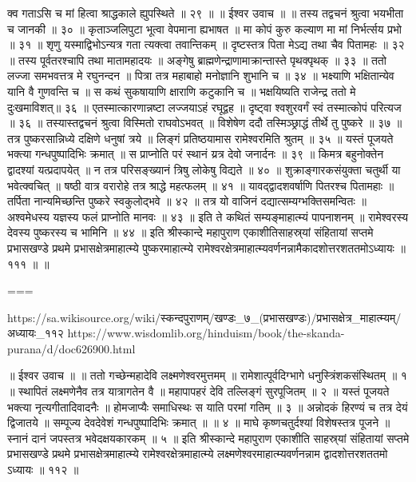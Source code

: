 क्व गताऽसि च मां हित्वा श्राद्धकाले ह्युपस्थिते ॥ २९ ॥
॥ ईश्वर उवाच ॥ ॥
तस्य तद्वचनं श्रुत्वा भयभीता च जानकी ॥ ३० ॥
कृताञ्जलिपुटा भूत्वा वेपमाना ह्यभाषत ॥
मा कोपं कुरु कल्याण मा मां निर्भर्त्सय प्रभो ॥ ३१ ॥
शृणु यस्माद्विभोऽन्यत्र गता त्यक्त्वा तवान्तिकम् ॥
दृष्टस्तत्र पिता मेऽद्य तथा चैव पितामहः ॥ ३२ ॥
तस्य पूर्वतरश्चापि तथा मातामहादयः ॥
अङ्गेषु ब्राह्मणेन्द्राणामाक्रान्तास्ते पृथक्पृथक् ॥ ३३ ॥
ततो लज्जा समभवत्तत्र मे रघुनन्दन ॥
पित्रा तत्र महाबाहो मनोज्ञानि शुभानि च ॥ ३४ ॥
भक्ष्याणि भक्षितान्येव यानि वै गुणवन्ति च ॥
स कथं सुकषायाणि क्षाराणि कटुकानि च ॥
भक्षयिष्यति राजेन्द्र ततो मे दुःखमाविशत्॥ ३६ ॥
एतस्मात्कारणान्नष्टा लज्जयाऽहं रघूद्वह ॥
दृष्ट्वा श्वशुरवर्गं स्वं तस्मात्कोपं परित्यज ॥ ३६ ॥
तस्यास्तद्वचनं श्रुत्वा विस्मितो राघवोऽभवत् ॥
विशेषेण ददौ तस्मिञ्छ्राद्धं तीर्थे तु पुष्करे ॥ ३७ ॥
तत्र पुष्करसान्निध्ये दक्षिणे धनुषां त्रये ॥
लिङ्गं प्रतिष्ठयामास रामेश्वरमिति श्रुतम् ॥ ३५ ॥
यस्तं पूजयते भक्त्या गन्धपुष्पादिभिः क्रमात् ॥
स प्राप्नोति परं स्थानं य्रत्र देवो जनार्दनः ॥ ३९ ॥
किमत्र बहुनोक्तेन द्वादश्यां यत्प्रदापयेत् ॥
न तत्र परिसङ्ख्यानं त्रिषु लोकेषु विद्यते ॥ ४० ॥
शुक्राङ्गारकसंयुक्ता चतुर्थी या भवेत्क्वचित् ॥
षष्ठी वात्र वरारोहे तत्र श्राद्धे महत्फलम् ॥ ४१ ॥
यावद्द्वादशवर्षाणि पितरश्च पितामहाः ॥
तर्पिता नान्यमिच्छन्ति पुष्करे स्वकुलोद्भवे ॥ ४२ ॥
तत्र यो वाजिनं दद्यात्सम्यग्भक्तिसमन्वितः ॥
अश्वमेधस्य यज्ञस्य फलं प्राप्नोति मानवः ॥ ४३ ॥
इति ते कथितं सम्यङ्माहात्म्यं पापनाशनम् ॥
रामेश्वरस्य देवस्य पुष्करस्य च भामिनि ॥ ४४ ॥
इति श्रीस्कान्दे महापुराण एकाशीतिसाहस्र्यां संहितायां सप्तमे प्रभासखण्डे प्रथमे प्रभासक्षेत्रमाहात्म्ये पुष्करमाहात्म्ये रामेश्वरक्षेत्रमाहात्म्यवर्णनन्नामैकादशोत्तरशततमोऽध्यायः ॥ १११ ॥ ॥

===

https://sa.wikisource.org/wiki/स्कन्दपुराणम्/खण्डः_७_(प्रभासखण्डः)/प्रभासक्षेत्र_माहात्म्यम्/अध्यायः_११२
https://www.wisdomlib.org/hinduism/book/the-skanda-purana/d/doc626900.html


॥ ईश्वर उवाच ॥ ॥
ततो गच्छेन्महादेवि लक्ष्मणेश्वरमुत्तमम् ॥
रामेशात्पूर्वदिग्भागे धनुस्त्रिंशकसंस्थितम् ॥ १ ॥
स्थापितं लक्ष्मणेनैव तत्र यात्रागतेन वै ॥
महापापहरं देवि तल्लिङ्गं सुरपूजितम् ॥ २ ॥
यस्तं पूजयते भक्त्या नृत्यगीतादिवादनैः ॥
होमजाप्यैः समाधिस्थः स याति परमां गतिम् ॥ ३ ॥
अन्नोदकं हिरण्यं च तत्र देयं द्विजातये ॥
सम्पूज्य देवदेवेशं गन्धपुष्पादिभिः क्रमात् ॥ ॥ ४ ॥
माघे कृष्णचतुर्दश्यां विशेषस्तत्र पूजने ॥
स्नानं दानं जपस्तत्र भवेदक्षयकारकम् ॥ ५ ॥
इति श्रीस्कान्दे महापुराण एकाशीति साहस्र्यां संहितायां सप्तमे प्रभासखण्डे प्रथमे प्रभासक्षेत्रमाहात्म्ये रामेश्वरक्षेत्रमाहात्म्ये लक्ष्मणेश्वरमाहात्म्यवर्णनन्नाम द्वादशोत्तरशततमो ऽध्यायः ॥ ११२ ॥


